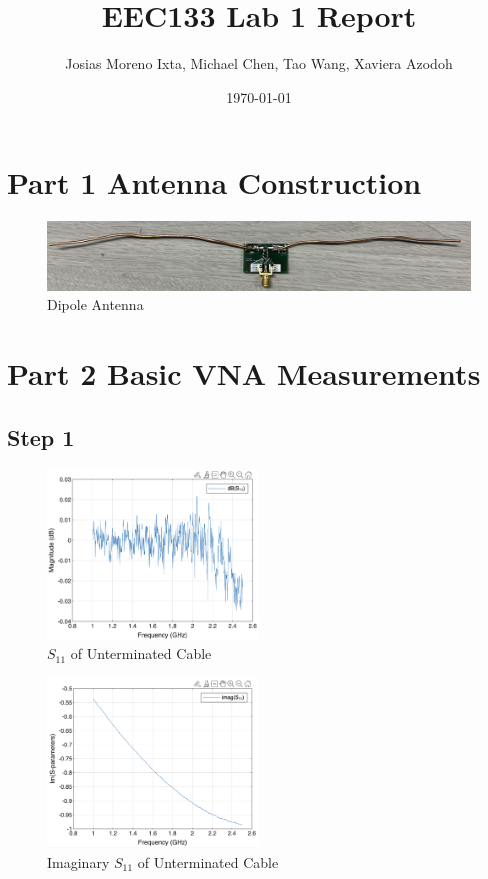 \documentclass{article} %
\begin{document}
\title{EEC133 Lab 1 Report}
\author{Josias Moreno Ixta, Michael Chen, Tao Wang, Xaviera Azodoh}
\date{\today}

\maketitle
\tableofcontents
\pagebreak

\section*{Part 1 Antenna Construction}
\begin{figure}[H]
    \centering
    \includegraphics[width=1\textwidth]{./image/figure1.jpeg}
    \caption{Dipole Antenna}
\end{figure}

\section*{Part 2 Basic VNA Measurements}

\subsection*{Step 1}
\begin{figure}[H]
    \centering
    \includegraphics[width=0.5\textwidth]{./image/figure2.png}
    \caption{$S_{11}$ of Unterminated Cable}
\end{figure}

\begin{figure}[H]
    \centering
    \includegraphics[width=0.5\textwidth]{./image/figure3.png}
    \caption{Imaginary $S_{11}$ of Unterminated Cable}
\end{figure}
\end{document}
